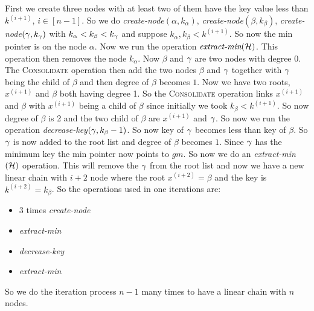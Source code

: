 \documentclass[a4paper, 11pt]{article}
\begin{document}
{\begin{itemize}
		First we create three nodes with at least two of them have the key value less than $k^{(i+1)}$, $i\in[n-1]$. So we do \textit{create-node}$(\alpha,k_{\alpha})$, \textit{create-node}$(\beta,k_{\beta})$, \textit{create-node}$(\gamma,k_{\gamma})$ with $k_{\alpha}<k_{\beta}<k_{\gamma}$ and  suppose $k_{\alpha},k_{\beta}<k^{(i+1)}$. So now the min pointer is on the node $\alpha$. Now we run the operation $\textit{extract-min}(\mathcal{H})$. This operation then removes the node $k_{\alpha}$. Now $\beta$ and $\gamma$ are two nodes with degree $0$. The \textsc{Consolidate} operation then add the two nodes $\beta$ and $\gamma$ together with $\gamma$ being the child of $\beta$ and then degree of $\beta$ becomes $1$. Now we have two roots, $x^{(i+1)}$ and $\beta$ both having degree 1. So the \textsc{Consolidate} operation links $x^{(i+1)}$ and $\beta$ with $x^{(i+1)}$ being a child of $\beta$ since initially we took $k_{\beta}<k^{(i+1)}$. So now degree of $\beta$ is 2 and the two child of $\beta $ are $x^{(i+1)}$ and $\gamma$. So now we run the operation \textit{decrease-key}$(\gamma,k_{\beta}-1)$. So now key of $\gamma$ becomes less than key of $\beta$. So $\gamma$ is now added to the root list  and degree of $\beta$ becomes $1$. Since $\gamma $ has the minimum key the min pointer now points to $gm$. So now we do an \textit{extract-min}$(\mathcal{H})$ operation. This will remove the $\gamma$ from the root list and now we have a new linear chain with $i+2$ node where the root $x^{(i+2)}=\beta$ and the key is $k^{(i+2)}=k_{\beta}$. So the operations used in one iterations are:
		\begin{itemize}
			\item $3$ times \textit{create-node}
			\item \textit{extract-min}
			\item \textit{decrease-key}
			\item \textit{extract-min}
		\end{itemize}
	\end{itemize}
So we do the iteration process $n-1$ many times to have a linear chain with $n$ nodes.  
}
\end{document}
